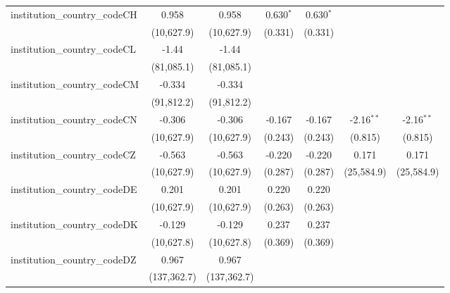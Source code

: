 \begin{tabular}{lcccccc}
   institution\_country\_codeCH          & 0.958         & 0.958         & 0.630$^{*}$   & 0.630$^{*}$   &               &   \\   
                                         & (10,627.9)    & (10,627.9)    & (0.331)       & (0.331)       &               &   \\   
   institution\_country\_codeCL          & -1.44         & -1.44         &               &               &               &   \\   
                                         & (81,085.1)    & (81,085.1)    &               &               &               &   \\   
   institution\_country\_codeCM          & -0.334        & -0.334        &               &               &               &   \\   
                                         & (91,812.2)    & (91,812.2)    &               &               &               &   \\   
   institution\_country\_codeCN          & -0.306        & -0.306        & -0.167        & -0.167        & -2.16$^{**}$  & -2.16$^{**}$\\   
                                         & (10,627.9)    & (10,627.9)    & (0.243)       & (0.243)       & (0.815)       & (0.815)\\   
   institution\_country\_codeCZ          & -0.563        & -0.563        & -0.220        & -0.220        & 0.171         & 0.171\\   
                                         & (10,627.9)    & (10,627.9)    & (0.287)       & (0.287)       & (25,584.9)    & (25,584.9)\\   
   institution\_country\_codeDE          & 0.201         & 0.201         & 0.220         & 0.220         &               &   \\   
                                         & (10,627.9)    & (10,627.9)    & (0.263)       & (0.263)       &               &   \\   
   institution\_country\_codeDK          & -0.129        & -0.129        & 0.237         & 0.237         &               &   \\   
                                         & (10,627.8)    & (10,627.8)    & (0.369)       & (0.369)       &               &   \\   
   institution\_country\_codeDZ          & 0.967         & 0.967         &               &               &               &   \\   
                                         & (137,362.7)   & (137,362.7)   &               &               &               &   \\   

\end{tabular}
